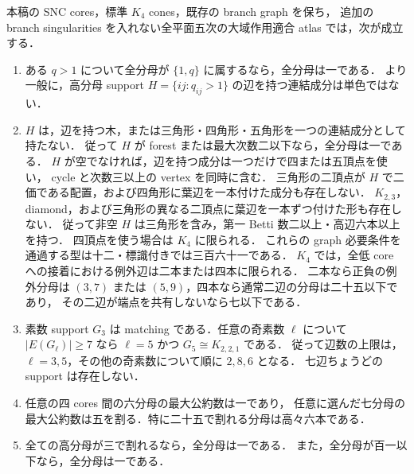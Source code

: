 \begin{theorem}[五次の高分母に対する一般障害]\label{main:quintic-denominators}
本稿の SNC cores，標準 $K_4$ cones，既存の branch graph を保ち，
追加の branch singularities を入れない全平面五次の大域作用適合 atlas では，次が成立する．
\begin{enumerate}
\item ある $q>1$ について全分母が $\{1,q\}$ に属するなら，全分母は一である．
より一般に，高分母 support $H=\{ij:q_{ij}>1\}$ の辺を持つ連結成分は単色ではない．
\item $H$ は，辺を持つ木，または三角形・四角形・五角形を一つの連結成分として持たない．
従って $H$ が forest または最大次数二以下なら，全分母は一である．
$H$ が空でなければ，辺を持つ成分は一つだけで四または五頂点を使い，
cycle と次数三以上の vertex を同時に含む．
三角形の二頂点が $H$ で二価である配置，および四角形に葉辺を一本付けた成分も存在しない．
$K_{2,3}$，diamond，および三角形の異なる二頂点に葉辺を一本ずつ付けた形も存在しない．
従って非空 $H$ は三角形を含み，第一 Betti 数二以上・高辺六本以上を持つ．
四頂点を使う場合は $K_4$ に限られる．
これらの graph 必要条件を通過する型は十二・標識付きでは三百六十一である．
$K_4$ では，全低 core への接着における例外辺は二本または四本に限られる．
二本なら正負の例外分母は $(3,7)$ または $(5,9)$，四本なら通常二辺の分母は二十五以下であり，
その二辺が端点を共有しないなら七以下である．
\item 素数 support $G_3$ は matching である．任意の奇素数 $\ell$ について
$|E(G_\ell)|\geq7$ なら $\ell=5$ かつ $G_5\cong K_{2,2,1}$ である．
従って辺数の上限は，$\ell=3,5$，その他の奇素数について順に $2,8,6$ となる．
七辺ちょうどの support は存在しない．
\item 任意の四 cores 間の六分母の最大公約数は一であり，
任意に選んだ七分母の最大公約数は五を割る．特に二十五で割れる分母は高々六本である．
\item 全ての高分母が三で割れるなら，全分母は一である．
また，全分母が百一以下なら，全分母は一である．
\end{enumerate}
\end{theorem}

